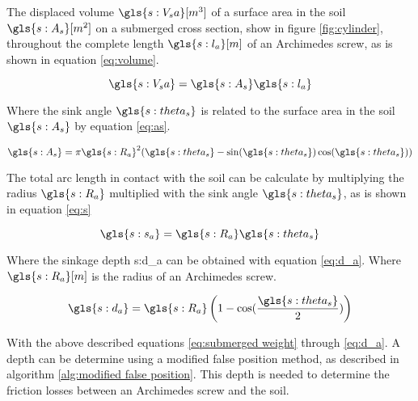 \noindent The displaced volume $ \gls{s:V_sa} [m^3] $ of a surface area in the soil $ \gls{s:A_s} [m^2] $ on a submerged cross section, show in figure \ref{fig:cylinder}, throughout the complete length $ \gls{s:l_a} [m]$ of an Archimedes screw, as is shown in equation \ref{eq:volume}.

\begin{sBox}
	\begin{equation}\label{eq:volume}
	\gls{s:V_sa} = \gls{s:A_s} \gls{s:l_a}
	\end{equation}
\end{sBox}

\noindent Where the sink angle $ \gls{s:theta_s} $ is related to the surface area in the soil $ \gls{s:A_s} $ by equation \ref{eq:as}.

\begin{sBox}
	\begin{equation}\label{eq:as}
	\gls{s:A_s} = \pi \gls{s:R_a}^2(\gls{s:theta_s} - \sin(\gls{s:theta_s})\cos(\gls{s:theta_s}))
	\end{equation}
\end{sBox}

\noindent The total arc length in contact with the soil can be calculate by multiplying the radius $ \gls{s:R_a} $ multiplied with the sink angle $ \gls{s:theta_s} $, as is shown in equation \ref{eq:s}
\begin{sBox}
	\begin{equation}\label{eq:s}
	\gls{s:s_a} = \gls{s:R_a} \gls{s:theta_s}
	\end{equation}
\end{sBox}

\noindent Where the sinkage depth \gls{s:d_a} can be obtained with equation \ref{eq:d_a}. Where $ \gls{s:R_a} [m] $ is the radius of an Archimedes screw.

\begin{sBox}
	\begin{equation}\label{eq:d_a}
	\gls{s:d_a} = \gls{s:R_a}\left(1-\cos(\frac{\gls{s:theta_s}}{2})\right)
	\end{equation}
\end{sBox}

With the above described equations \ref{eq:submerged weight} through \ref{eq:d_a}. A depth can be determine using a modified false position method, as described in algorithm \ref{alg:modified false position}. This depth is needed to determine the friction losses between an Archimedes screw and the soil.


